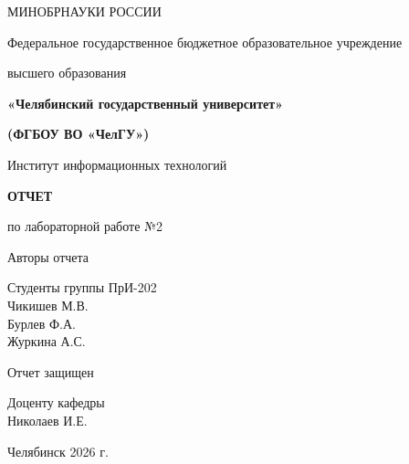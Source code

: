 \setmainfont{Liberation Serif}
\setsansfont{Liberation Sans}
\setmonofont{Liberation Mono}

\begin{titlepage}
\thispagestyle{empty}
\centering

{\small МИНОБРНАУКИ РОССИИ\par}
{\small Федеральное государственное бюджетное образовательное учреждение\par
высшего образования\par}
{\bfseries\small «Челябинский государственный университет»\par}
{\bfseries\small (ФГБОУ ВО «ЧелГУ»)\par}

\vspace{1.5em}
{\small Институт информационных технологий\par}

\vfill

{\Large\bfseries ОТЧЕТ\par}
\vspace{0.8em}
{\large по лабораторной работе №2\par}

\vfill

\begin{small}
\noindent
\begin{minipage}[t]{0.45\textwidth}
Авторы отчета
\end{minipage}%
\begin{minipage}[t]{0.5\textwidth}
Студенты группы ПрИ-202\\
Чикишев М.В.\\
Бурлев Ф.А.\\
Журкина А.С.
\end{minipage}

\vspace{4em}

\noindent
\begin{minipage}[t]{0.45\textwidth}
Отчет защищен
\end{minipage}%
\begin{minipage}[t]{0.5\textwidth}
Доценту кафедры\\
Николаев И.Е.
\end{minipage}
\end{small}

\vfill

{\small Челябинск 2026 г.\par}

\end{titlepage}
\newpage
\setcounter{page}{2}
